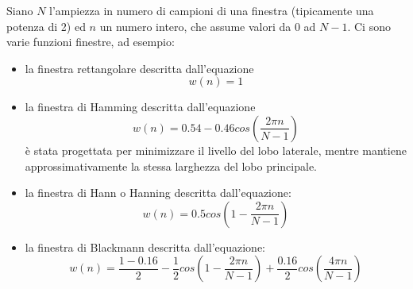 Siano $N$ l'ampiezza in numero di campioni di una finestra (tipicamente una potenza di 2) ed $n$ un numero intero, che assume valori da $0$ ad $N-1$. Ci sono varie funzioni finestre, ad esempio: 
  \begin{itemize}
    \item 
      la finestra rettangolare descritta dall'equazione 
      \[
	w(n)=1  
      \]
    \item
      la finestra di Hamming descritta dall'equazione
      \[
	w(n)=0.54-0.46 cos \left(\frac{2 \pi n}{N-1}\right)
      \]
      \`e stata progettata per minimizzare il livello del lobo laterale, mentre mantiene approssimativamente la stessa larghezza del lobo principale.
    \item
      la finestra di Hann o Hanning descritta dall'equazione:
      \[
	w(n)=0.5 cos \left(1-\frac{2 \pi n}{N-1}\right)
      \]
    \item
      la finestra di Blackmann descritta dall'equazione:
      \[
	w(n)=\frac{1-0.16}{2} - \frac{1}{2} cos \left(1-\frac{2 \pi n}{N-1}\right) + \frac{0.16}{2} cos \left(\frac{4 \pi n}{N-1}\right)
      \]
  \end{itemize}


